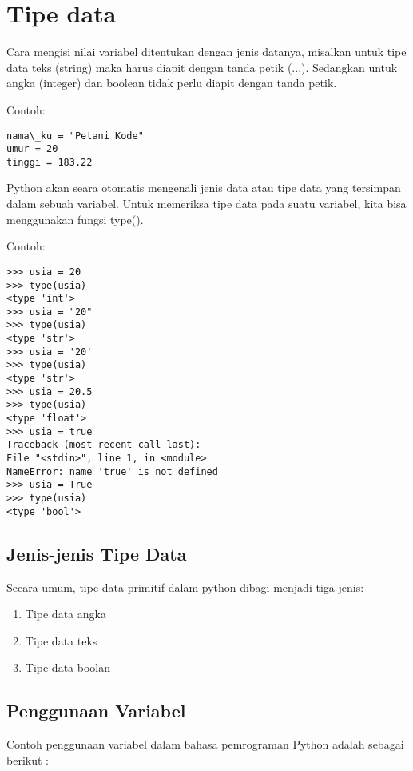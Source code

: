 \documentclass[12pt]{article}
\begin{document}
\section{Tipe data}
Cara mengisi nilai variabel ditentukan dengan jenis datanya, misalkan untuk tipe data teks (string) maka harus diapit dengan tanda petik (...). Sedangkan untuk angka (integer) dan boolean tidak perlu diapit dengan tanda petik.

Contoh:

\begin{verbatim}
nama\_ku = "Petani Kode"
umur = 20
tinggi = 183.22
\end{verbatim}

Python akan seara otomatis mengenali jenis data atau tipe data yang tersimpan dalam sebuah variabel. Untuk memeriksa tipe data pada suatu variabel, kita bisa menggunakan fungsi type().

Contoh:

\begin{verbatim}
>>> usia = 20
>>> type(usia)
<type 'int'>
>>> usia = "20"
>>> type(usia)
<type 'str'>
>>> usia = '20'
>>> type(usia)
<type 'str'>
>>> usia = 20.5
>>> type(usia)
<type 'float'>
>>> usia = true
Traceback (most recent call last):
File "<stdin>", line 1, in <module>
NameError: name 'true' is not defined
>>> usia = True
>>> type(usia)
<type 'bool'>
\end{verbatim}

\subsection{Jenis-jenis Tipe Data}

Secara umum, tipe data primitif dalam python dibagi menjadi tiga jenis:

\begin{enumerate}
\item Tipe data angka
\item Tipe data teks
\item Tipe data boolan
\end{enumerate}

\subsection{Penggunaan Variabel}
Contoh penggunaan variabel  dalam bahasa pemrograman Python adalah sebagai berikut :
\end{document}

